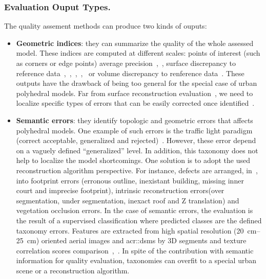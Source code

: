\documentclass[runningheads]{llncs}
\begin{document}
\subsubsection{Evaluation Ouput Types.}
The quality assement methods can produce two kinds of ouputs:
\begin{itemize}
	\item \textbf{Geometric indices}: they can summarize the quality of the whole assessed model. These indices are computed at different scales: points of interest (such as corners or edge points) average precision~\cite{Kaartinen2005},~\cite{Voegtle2003}, surface discrepancy to reference data~\cite{Kaartinen2005},~\cite{Henricsson1997},~\cite{Zeng2014},~\cite{Lafarge2012},~\cite{li2016boxfitting} or volume discrepancy to renference data~\cite{Zeng2014}. These outputs have the drawback of being too general for the special case of urban polyhedral models. Far from surface reconstruction evaluation~\cite{berger2013benchmark}, we need to localize specific types of errors that can be easily corrected once identified~\cite{OudeElberink2010}.
	\item \textbf{Semantic errors}: they identify topologic and geometric errors that affects polyhedral models. One example of such errors is the traffic light paradigm (correct acceptable, generalized and rejected)~\cite{boudet2006supervised}. However, these error depend on a vaguely defined ``generalized'' level. In addition, this taxonomy does not help to localize the model shortcomings. One solution is to adopt the used reconstruction algorithm perspective. For instance, defects are arranged, in~\cite{Michelin2013}, into footprint errors (erronous outline, inexistant building, missing inner court and imprecise footprint), intrinsic reconstruction errors(over segmentation, under segmentation, inexact roof and Z translation) and vegetation occlusion errors. In the case of semantic errors, the evaluation is the result of a supervised classification where predicted classes are the defined taxonomy errors. Features are extracted from high spatial resolution (\SIrange{20}{25}{\cm}) oriented aerial images and \glspl{acr::dsm} by 3D segments and texture correlation scores comparison~\cite{boudet2006supervised},~\cite{Michelin2013}. In spite of the contribution with semantic information for quality evaluation, taxonomies can overfit to a special urban scene or a reconstruction algorithm.
\end{itemize}
\end{document}
